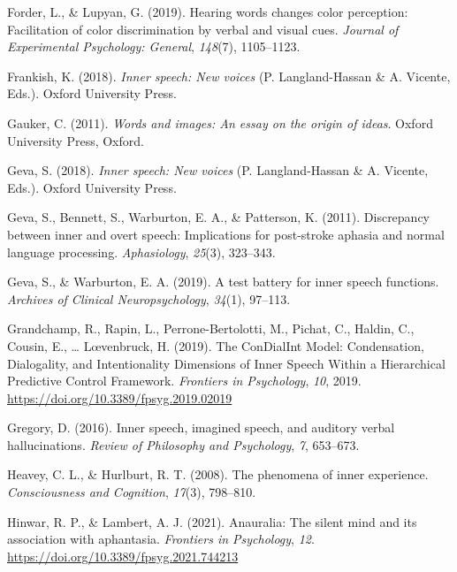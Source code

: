 \documentclass[
  man,a4paper,floatsintext]{apa6}
\newlength{\cslhangindent}
\newlength{\cslentryspacingunit} %
\newenvironment{CSLReferences}[2] %
 {%
  \setlength{\parindent}{0pt}
  \ifodd #1
  \let\oldpar\par
  \def\par{\hangindent=\cslhangindent\oldpar}
  \fi
  \setlength{\parskip}{#2\cslentryspacingunit}
 }%
 {}
\begin{document}
\begin{CSLReferences}{1}{0}
\leavevmode{}%
Forder, L., \& Lupyan, G. (2019). Hearing words changes color perception: Facilitation of color discrimination by verbal and visual cues. \emph{Journal of Experimental Psychology: General}, \emph{148}(7), 1105--1123.

\leavevmode{}%
Frankish, K. (2018). \emph{Inner speech: New voices} (P. Langland-Hassan \& A. Vicente, Eds.). Oxford University Press.

\leavevmode{}%
Gauker, C. (2011). \emph{Words and images: An essay on the origin of ideas}. Oxford University Press, Oxford.

\leavevmode{}%
Geva, S. (2018). \emph{Inner speech: New voices} (P. Langland-Hassan \& A. Vicente, Eds.). Oxford University Press.

\leavevmode{}%
Geva, S., Bennett, S., Warburton, E. A., \& Patterson, K. (2011). Discrepancy between inner and overt speech: Implications for post-stroke aphasia and normal language processing. \emph{Aphasiology}, \emph{25}(3), 323--343.

\leavevmode{}%
Geva, S., \& Warburton, E. A. (2019). A test battery for inner speech functions. \emph{Archives of Clinical Neuropsychology}, \emph{34}(1), 97--113.

\leavevmode{}%
Grandchamp, R., Rapin, L., Perrone-Bertolotti, M., Pichat, C., Haldin, C., Cousin, E., \ldots{} Lœvenbruck, H. (2019). The {ConDialInt} {Model}: {Condensation}, {Dialogality}, and {Intentionality} {Dimensions} of {Inner} {Speech} {Within} a {Hierarchical} {Predictive} {Control} {Framework}. \emph{Frontiers in Psychology}, \emph{10}, 2019. \url{https://doi.org/10.3389/fpsyg.2019.02019}

\leavevmode{}%
Gregory, D. (2016). Inner speech, imagined speech, and auditory verbal hallucinations. \emph{Review of Philosophy and Psychology}, \emph{7}, 653--673.

\leavevmode{}%
Heavey, C. L., \& Hurlburt, R. T. (2008). The phenomena of inner experience. \emph{Consciousness and Cognition}, \emph{17}(3), 798--810.

\leavevmode{}%
Hinwar, R. P., \& Lambert, A. J. (2021). Anauralia: The silent mind and its association with aphantasia. \emph{Frontiers in Psychology}, \emph{12}. \url{https://doi.org/10.3389/fpsyg.2021.744213}


\end{CSLReferences}
\end{document}
